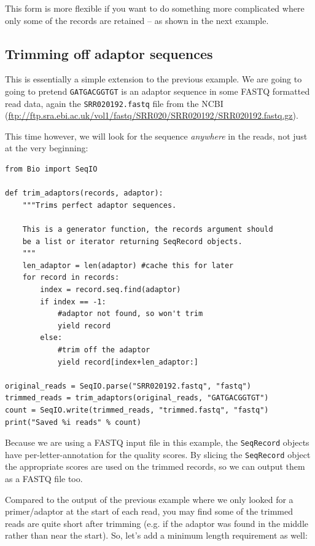 \documentclass{report}
\begin{document}
This form is more flexible if you want to do something more complicated
where only some of the records are retained -- as shown in the next example.

\subsection{Trimming off adaptor sequences}
\label{sec:FASTQ-slicing-off-adaptor}

This is essentially a simple extension to the previous example. We are going
to going to pretend \texttt{GATGACGGTGT} is an adaptor sequence in some FASTQ
formatted read data, again the \texttt{SRR020192.fastq} file from the NCBI
(\url{ftp://ftp.sra.ebi.ac.uk/vol1/fastq/SRR020/SRR020192/SRR020192.fastq.gz}).

This time however, we will look for the sequence \emph{anywhere} in the reads,
not just at the very beginning:

\begin{verbatim}
from Bio import SeqIO

def trim_adaptors(records, adaptor):
    """Trims perfect adaptor sequences.
    
    This is a generator function, the records argument should
    be a list or iterator returning SeqRecord objects.
    """
    len_adaptor = len(adaptor) #cache this for later
    for record in records:
        index = record.seq.find(adaptor)
        if index == -1:
            #adaptor not found, so won't trim
            yield record
        else:
            #trim off the adaptor
            yield record[index+len_adaptor:]

original_reads = SeqIO.parse("SRR020192.fastq", "fastq")
trimmed_reads = trim_adaptors(original_reads, "GATGACGGTGT")
count = SeqIO.write(trimmed_reads, "trimmed.fastq", "fastq") 
print("Saved %i reads" % count)
\end{verbatim}

Because we are using a FASTQ input file in this example, the \verb|SeqRecord|
objects have per-letter-annotation for the quality scores. By slicing the
\verb|SeqRecord| object the appropriate scores are used on the trimmed
records, so we can output them as a FASTQ file too.

Compared to the output of the previous example where we only looked for
a primer/adaptor at the start of each read, you may find some of the
trimmed reads are quite short after trimming (e.g. if the adaptor was
found in the middle rather than near the start). So, let's add a minimum
length requirement as well:
\end{document}
